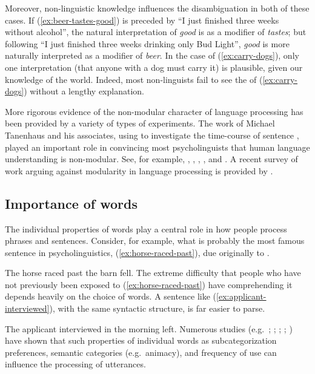 \documentclass[output=paper
 	        ,biblatex
                ,babelshorthands
                ,newtxmath
                ,draftmode
                ,colorlinks, citecolor=brown
]{langscibook}
\begin{document}
Moreover, non-linguistic knowledge influences the disambiguation in both of these cases.  If (\ref{ex:beer-tastes-good}) is preceded by ``I just finished three weeks without alcohol'', the natural interpretation of \emph{good} is as a modifier of \emph{tastes}; but following ``I just finished three weeks drinking only Bud Light'', \emph{good} is more naturally interpreted as a modifier of \emph{beer}.  In the case of (\ref{ex:carry-dogs}), only one interpretation (that anyone with a dog must carry it) is plausible, given our knowledge of the world.  Indeed, most non-linguists fail to see the  of (\ref{ex:carry-dogs}) without a lengthy explanation.  

More rigorous evidence of the non-modular character of language processing has been provided by a variety of types of experiments.  The work of Michael Tanenhaus  and his associates, using  to investigate the time-course of sentence , played an important role in convincing most psycholinguists that human language understanding is non-modular.  See, for example, \citet{EberhardEtal95}, \citet{McMurrayEtal2008}, \citet{TSKES95a}, \citet{TSKES96a}, and \citet{TanenhausTrueswell95}. A recent survey of work arguing against modularity in language processing is provided by \citet{SpevackEtal2018}.  

\subsection{Importance of words}
\label{sec-importance-of-words}

The individual properties of words play a central role in how people process phrases and sentences.
Consider, for example, what is probably the most famous sentence in psycholinguistics,
(\ref{ex:horse-raced-past}), due originally to \citet[]{Bever70}.

\ea\label{ex:horse-raced-past}
The horse raced past the barn fell.
\z
The extreme difficulty that people who have not previously been exposed to
(\ref{ex:horse-raced-past}) have comprehending it depends heavily on the choice of words.  A
sentence like (\ref{ex:applicant-interviewed}), with the same syntactic structure, is far easier to
parse.

\ea\label{ex:applicant-interviewed}
The applicant interviewed in the morning left.
\z
Numerous studies (e.g.\ \citealt{FordEtal82}; \citealt{TrueswellEtal93}; \citealt{MPS94a-u}; \citealt{BresnanEtal2007}; \citealt{WasowEtal2011}) have shown that such properties of individual words as subcategorization preferences, semantic categories (e.g.\ animacy), and frequency of use can influence the processing of utterances.  
\end{document}
